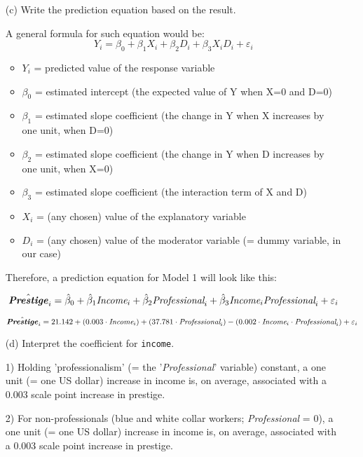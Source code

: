 \documentclass[12pt,letterpaper]{article}
\begin{document}
\begin{enumerate}
	\item [(c)]
	Write the prediction equation based on the result.
	
A general formula for such equation would be: 
\[ Y_i = \beta_0 + \beta_1 X_i + \beta_2 D_i + \beta_3 X_i D_i + \varepsilon_i \]


\begin{flushleft}
	\begin{itemize}
		\item $\textit{Y}_{i}$ = predicted value of the response variable 
		\item $\beta_0$ = estimated intercept (the expected value of Y when X=0 and D=0)
		\item $\beta_1 $ = estimated slope coefficient (the change in Y when X increases by one unit, when D=0)
		\item $\beta_2$ = estimated slope coefficient (the change in Y when D increases by one unit, when X=0)
		\item $\beta_3$ = estimated slope coefficient (the interaction term of X and D)
		\item $\textit{X}_{i}$ = (any chosen) value of the explanatory variable 
		\item $\textit{D}_{i}$ = (any chosen) value of the moderator variable (= dummy variable, in our case)
		
	\end{itemize}
\end{flushleft}

Therefore, a prediction equation for Model 1 will look like this:

\[ \hat{\textbf{\textit{Prestige}}}_i = \hat{\beta}_0 + \hat{\beta}_1 \textit{Income}_i + \hat{\beta}_2 \textit{Professional}_i + \hat{\beta}_3 \textit{Income}_i \textit{Professional}_i + \varepsilon_i \]

\[ \hat{\textbf{\textit{Prestige}}}_i = 21.142 + (0.003 \cdot \textit{Income}_i) + (37.781 \cdot \textit{Professional}_i) - (0.002 \cdot \textit{Income}_i \cdot \textit{Professional}_i)+ \varepsilon_i \]


	\item [(d)]
	Interpret the coefficient for \texttt{income}.
	
1) Holding 'professionalism' (= the '\textit{Professional}' variable) constant, a one unit (= one US dollar) increase in income is, on average, associated with a 0.003 scale point increase in prestige. 

2) For non-professionals (blue and white collar workers; \textit{Professional }= 0), a one unit (= one US dollar) increase in income is, on average, associated with a 0.003 scale point increase in prestige. 


\end{enumerate}
\end{document}
